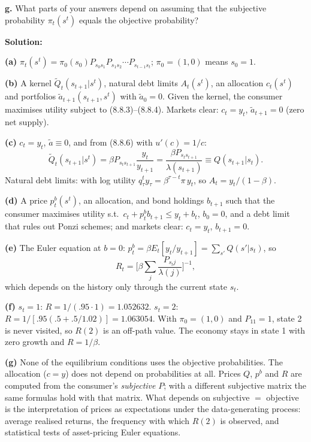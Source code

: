 \documentclass[12pt, letterpaper]{article}
\begin{document}
\begin{tcolorbox}[evenbox,title={Exercise 8.20 \quad Risk-free bonds}]
\begin{tcolorbox}[questionbox]
\textbf{g.} What parts of your answers depend on assuming that the subjective probability $\pi_t(s^t)$ equals
the objective probability?
\end{tcolorbox}

\textbf{Solution:}

\textbf{(a)} $\pi_t(s^t)=\pi_0(s_0)P_{s_0s_1}P_{s_1s_2}\cdots P_{s_{t-1}s_t}$; $\pi_0=(1,0)$ means $s_0=1$.

\textbf{(b)} A kernel $\tilde Q_t(s_{t+1}|s^t)$, natural debt limits $A_t(s^t)$, an allocation $c_t(s^t)$ and portfolios
$\tilde a_{t+1}(s_{t+1},s^t)$ with $\tilde a_0=0$. Given the kernel, the consumer maximises utility subject to (8.8.3)--(8.8.4).
Markets clear: $c_t=y_t$, $\tilde a_{t+1}=0$ (zero net supply).

\textbf{(c)} $c_t=y_t$, $\tilde a\equiv0$, and from (8.8.6) with $u'(c)=1/c$:
\[
\tilde Q_t(s_{t+1}|s^t)=\beta P_{s_ts_{t+1}}\frac{y_t}{y_{t+1}}=\frac{\beta P_{s_ts_{t+1}}}{\lambda(s_{t+1})}\equiv Q(s_{t+1}|s_t).
\]
Natural debt limits: with log utility $q^t_\tau y_\tau=\beta^{\tau-t}\pi\,y_t$, so $A_t=y_t/(1-\beta)$.

\textbf{(d)} A price $p^b_t(s^t)$, an allocation, and bond holdings $b_{t+1}$ such that the consumer maximises
utility s.t.\ $c_t+p^b_tb_{t+1}\le y_t+b_t$, $b_0=0$, and a debt limit that rules out Ponzi schemes; and markets
clear: $c_t=y_t$, $b_{t+1}=0$.

\textbf{(e)} The Euler equation at $b=0$: $p^b_t=\beta E_t[y_t/y_{t+1}]=\sum_{s'}Q(s'|s_t)$, so
\[
\boxed{R_t=\Big[\beta\sum_{j}\frac{P_{s_tj}}{\lambda(j)}\Big]^{-1},}
\]
which depends on the history only through the current state $s_t$.

\textbf{(f)} $s_t=1$: $R=1/(.95\cdot1)=1.052632$. $s_t=2$: $R=1/[.95(.5+.5/1.02)]=1.063054$. With $\pi_0=(1,0)$ and
$P_{11}=1$, state 2 is never visited, so $R(2)$ is an off-path value. The economy stays in state 1 with zero growth
and $R=1/\beta$.

\textbf{(g)} None of the equilibrium conditions uses the objective probabilities. The allocation ($c=y$) does not
depend on probabilities at all. Prices $Q$, $p^b$ and $R$ are computed from the consumer's \emph{subjective}
$P$; with a different subjective matrix the same formulas hold with that matrix. What depends on
subjective $=$ objective is the interpretation of prices as expectations under the data-generating process:
average realised returns, the frequency with which $R(2)$ is observed, and statistical tests of asset-pricing
Euler equations.
\end{tcolorbox}
\end{document}
